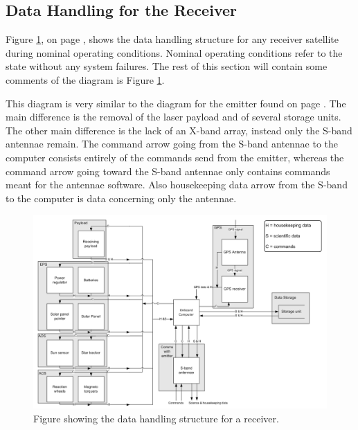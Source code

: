 \subsection{Data Handling for the Receiver}
\label{DataHandlingReceiver}

Figure \ref{fig:DHR}, on page \pageref{fig:DHR}, shows the data handling structure for any receiver satellite during nominal operating conditions. Nominal operating conditions refer to the state without any system failures. The rest of this section will contain some comments of the diagram is Figure \ref{fig:DHR}.

This diagram is very similar to the diagram for the emitter found on page \pageref{fig:DHE}. The main difference is the removal of the laser payload and of several storage units. The other main difference is the lack of an X-band array, instead only the S-band antennae remain. The command arrow going from the S-band antennae to the computer consists entirely of the commands send from the emitter, whereas the command arrow going toward the S-band antennae only contains commands meant for the antennae software. Also housekeeping data arrow from the S-band to the computer is data concerning only the antennae.

\begin{figure}
\centering
\includegraphics[width=1.0\textwidth, angle=90]{img/DHReceiver.png}
\caption{Figure showing the data handling structure for a receiver.}
\label{fig:DHR}
\end{figure}
